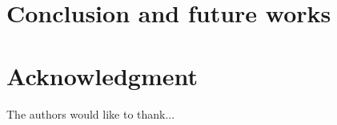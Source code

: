 \documentclass[conference]{IEEEtran}
\begin{document}
	
	\section{Conclusion and future works}
	
	
	
	\section*{Acknowledgment}
	
	
	The authors would like to thank...
	
	
	
	
	
	
	
\end{document}
